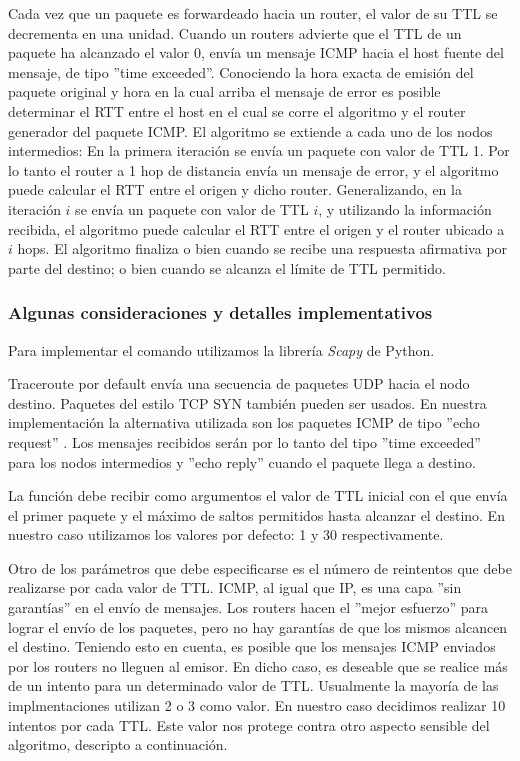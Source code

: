 Cada vez que un paquete es forwardeado hacia un router, el valor de su TTL se decrementa en una unidad.
Cuando un routers advierte que el TTL de un paquete ha alcanzado el valor 0, envía un mensaje ICMP hacia
el host fuente del mensaje, de tipo ''time exceeded''. Conociendo la hora exacta de emisión del paquete
original y hora en la cual arriba el mensaje de error es posible determinar el RTT entre el host en el cual se corre el algoritmo
y el router generador del paquete ICMP.
El algoritmo se extiende a cada uno de los nodos intermedios:
En la primera iteración se envía un paquete con valor de TTL 1. Por lo tanto el router a 1 hop de
distancia envía un mensaje de error, y el algoritmo puede calcular el RTT entre el origen y dicho
router.
Generalizando, en la iteración $i$ se envía un paquete con valor de TTL $i$, y utilizando la información
recibida, el algoritmo puede calcular el RTT entre el origen y el router ubicado a $i$ hops.
El algoritmo finaliza o bien cuando se recibe una respuesta afirmativa por parte del destino; o bien
cuando se alcanza el límite de TTL permitido.

\subsubsection{Algunas consideraciones y detalles implementativos}

Para implementar el comando utilizamos la librería \emph{Scapy} de Python.

Traceroute por default envía una secuencia de paquetes UDP hacia el nodo destino. Paquetes del estilo
TCP SYN también pueden ser usados. En nuestra implementación la alternativa utilizada son los paquetes
ICMP de tipo ''echo request'' . Los mensajes recibidos serán por lo tanto del tipo ''time exceeded''
para los nodos intermedios y ''echo reply'' cuando el paquete llega a destino.

La función debe recibir como argumentos el valor de TTL inicial con el que envía el primer paquete
y el máximo de saltos permitidos hasta alcanzar el destino. En nuestro caso utilizamos los valores
por defecto: 1 y 30 respectivamente.

Otro de los parámetros que debe especificarse es el número de reintentos que debe realizarse por cada
valor de TTL. ICMP, al igual que IP, es una capa ''sin garantías'' en el envío de mensajes. Los routers
hacen el ''mejor esfuerzo'' para lograr el envío de los paquetes, pero no hay garantías de que los mismos
alcancen el destino.
Teniendo esto en cuenta, es posible que los mensajes ICMP enviados por los routers no lleguen al emisor.
En dicho caso, es deseable que se realice más de un intento para un determinado valor de TTL.
Usualmente la mayoría de las implmentaciones utilizan 2 o 3 como valor. En nuestro caso decidimos
realizar 10 intentos por cada TTL. Este valor nos protege contra otro aspecto sensible del algoritmo,
descripto a continuación.

